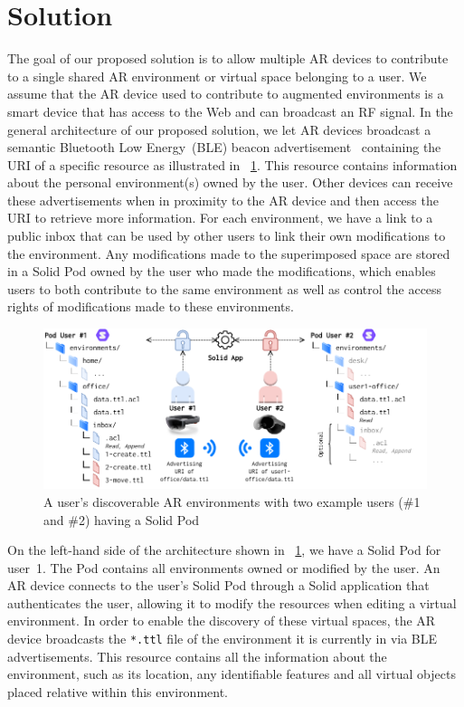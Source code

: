 \section{Solution}
The goal of our proposed solution is to allow multiple AR devices to contribute to a single shared AR environment or virtual space belonging to a user. We assume that the AR device used to contribute to augmented environments is a smart device that has access to the Web and can broadcast an RF signal. In the general architecture of our proposed solution, we let AR devices broadcast a semantic Bluetooth Low Energy~(BLE) beacon advertisement~\cite{10.1145/3627050.3627060} containing the URI of a specific resource as illustrated in \figurename~\ref{fig:architecture}. This resource contains information about the personal environment(s) owned by the user. Other devices can receive these advertisements when in proximity to the AR device and then access the URI to retrieve more information. For each environment, we have a link to a public inbox that can be used by other users to link their own modifications to the environment. Any modifications made to the superimposed space are stored in a Solid Pod owned by the user who made the modifications, which enables users to both contribute to the same environment as well as control the access rights of modifications made to these environments.

\begin{figure}[t]
    \centering
    \includegraphics[scale=0.90]{images/sosy_architecture.pdf}
    \caption{A user's discoverable AR environments with two example users (\#1 and \#2) having a Solid Pod}
    \label{fig:architecture}
\end{figure}

On the left-hand side of the architecture shown in \figurename~\ref{fig:architecture}, we have a Solid Pod for user~1. The Pod contains all environments owned or modified by the user. An AR device connects to the user's Solid Pod through a Solid application that authenticates the user, allowing it to modify the resources when editing a virtual environment. In order to enable the discovery of these virtual spaces, the AR device broadcasts the \texttt{*.ttl} file of the environment it is currently in via BLE advertisements. This resource contains all the information about the environment, such as its location, any identifiable features and all virtual objects placed relative within this environment.

